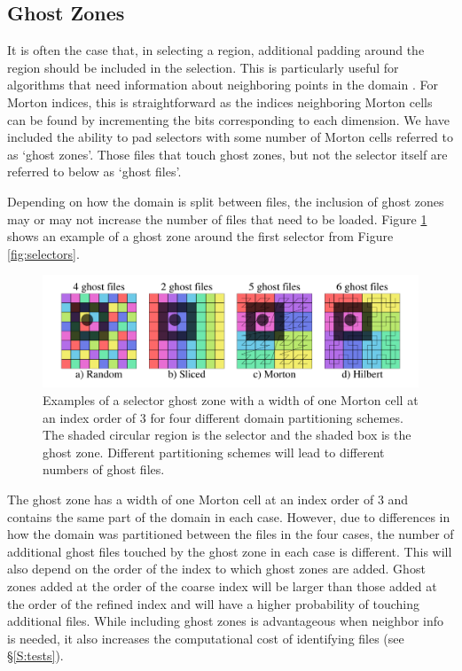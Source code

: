 \documentclass[apjl]{emulateapj}
\begin{document}
\subsection{Ghost Zones}
It is often the case that, in selecting a region, additional padding around the region should be included in the selection. This is particularly useful for algorithms that need information about neighboring points in the domain \citep[e.g. gas properties in simulations using Smoothed Particle Hydrodynamics; SPH;][]{Springel2001,Springel2005b}. For Morton indices, this is straightforward as the indices neighboring Morton cells can be found by incrementing the bits corresponding to each dimension. We have included the ability to pad selectors with some number of Morton cells referred to as `ghost zones'. Those files that touch ghost zones, but not the selector itself are referred to below as `ghost files'. 

Depending on how the domain is split between files, the inclusion of ghost zones may or may not increase the number of files that need to be loaded. Figure \ref{fig:ghosts} shows an example of a ghost zone around the first selector from Figure \ref{fig:selectors}. 
%
\begin{figure}[htbp]
\begin{center}
\includegraphics[width=\columnwidth,keepaspectratio]{../images/ghosts.png}
\caption{Examples of a selector ghost zone with a width of one Morton cell at an index order of 3 for  four different domain partitioning schemes. The shaded circular region is the selector and the shaded box is the ghost zone. Different partitioning schemes will lead to different numbers of ghost files.}
\label{fig:ghosts}
\end{center}
\end{figure}
%
The ghost zone has a width of one Morton cell at an index order of 3 and contains the same part of the domain in each case. However, due to differences in how the domain was partitioned between the files in the four cases, the number of additional ghost files touched by the ghost zone in each case is different. This will also depend on the order of the index to which ghost zones are added. Ghost zones added at the order of the coarse index will be larger than those added at the order of the refined index and will have a higher probability of touching additional files. While including ghost zones is advantageous when neighbor info is needed, it also increases the computational cost of identifying files (see \S\ref{S:tests}). 
\end{document}
